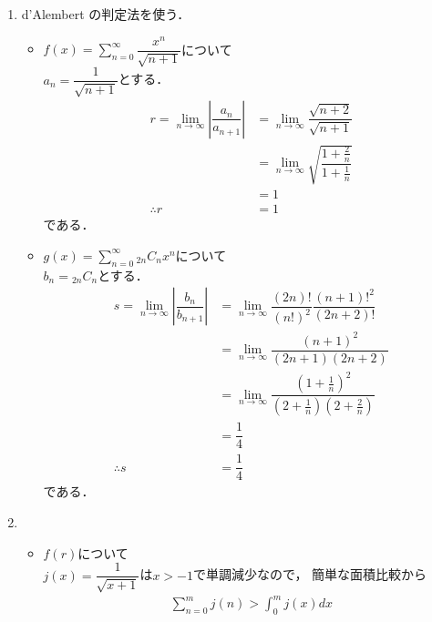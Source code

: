 




\maketitle

\begin{enumerate}[(1)]
    \item d'Alembert の判定法を使う．
    \begin{itemize}
        \item $f(x)=\displaystyle\sum_{n=0}^\infty \dfrac{x^n}{\sqrt{n+1}}$について\\
        $a_n=\dfrac{1}{\sqrt{n+1}}$とする．
        \begin{align}
            r=\lim_{n\to\infty}\left|\dfrac{a_n}{a_{n+1}}\right|
            &=\lim_{n\to\infty}\dfrac{\sqrt{n+2}}{\sqrt{n+1}}\\
            &=\lim_{n\to\infty}\sqrt{\dfrac{1+\frac{2}{n}}{1+\frac{1}{n}}}\\
            &=1\\
            \therefore r &= 1
        \end{align}
        である．
        \item $g(x)=\displaystyle\sum_{n=0}^\infty{}_{2n}C_n x^n$について\\
        $b_n={}_{2n}C_n$とする．
        \begin{align}
            s=\lim_{n\to\infty}\left|\dfrac{b_n}{b_{n+1}}\right|
            &=\lim_{n\to\infty}\dfrac{(2n)!}{(n!)^2}\dfrac{(n+1)!^2}{(2n+2)!}\\
            &=\lim_{n\to\infty}\dfrac{(n+1)^2}{(2n+1)(2n+2)}\\
            &=\lim_{n\to\infty}\dfrac{(1+\frac{1}{n})^2}{(2+\frac{1}{n})(2+\frac{2}{n})}\\
            &=\dfrac{1}{4}\\
            \therefore s&=\dfrac{1}{4}
        \end{align}
        である．
    \end{itemize}
    \item 
    \begin{itemize}
        \item $f(r)$について\\
        $j(x)=\dfrac{1}{\sqrt{x+1}}$は$x>-1$で単調減少なので，
        簡単な面積比較から
        \begin{align}
            \sum_{n=0}^m j(n)>\int_0^{m}j(x)dx

\end{align}
\end{itemize}
\end{enumerate}
